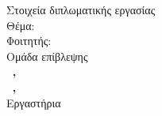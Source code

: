 \pagestyle{empty}
\hspace{10pt}
\begin{center}
  \Large{Στοιχεία διπλωματικής εργασίας}\\[1cm]
  {\large Θέμα:}
  \textbf{\large \doctitle}\\[1cm]
  \large {Φοιτητής: \textbf{\nomme}}\\[1cm]
  \large{Ομάδα επίβλεψης}\\
  \textbf{\suptitle \, \supname , \supuni}\\[1cm]
  \textbf{\cosuptitle \, \cosupname , \cosupuni}\\[1cm]
  Εργαστήρια\\
  \lab \\[1cm]
\end{center}
